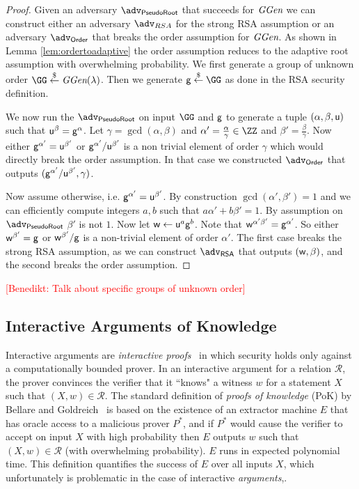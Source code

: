 \documentclass{article}
\theoremstyle{definition}
\newcommand{\benedikt}[1]{{\textcolor{red}{[Benedikt: #1]}}}
\newcommand{\benedikt}[1]{}
\begin{document}
\begin{proof}
	Given an adversary $\adv_{\textsf{PseudoRoot}}$ that succeeds for $\textit{GGen}$ we can construct either an adversary $\adv_{RSA}$ for the strong RSA assumption or an adversary $\adv_{\textsf{Order}}$ that breaks the order assumption for $\textit{GGen}$. As shown in Lemma \ref{lem:ordertoadaptive} the order assumption reduces to the adaptive root assumption with overwhelming probability. 
	We first generate a group of unknown order $\GG \sample \ggen(\lambda)$.
	Then we generate $\gr{g}\sample \GG$ as done in the \textsf{RSA} security definition.
	
	We now run the $\adv_{\textsf{PseudoRoot}}$ on input $\GG$ and $\mathsf{g}$ to generate a tuple $(\alpha,\beta,\mathsf{u})$ such that $\mathsf{u}^{\beta}=\mathsf{g}^{\alpha}$. Let $\gamma=\gcd(\alpha,\beta)$ and $\alpha'=\frac{\alpha}{\gamma}\in \ZZ$ and  $\beta'=\frac{\beta}{\gamma}$. Now either $\mathsf{g}^{\alpha'}=\mathsf{u}^{\beta'}$ or $\mathsf{g}^{\alpha'}/\mathsf{u}^{\beta'}$ is a non trivial element of order $\gamma$ which would directly break the order assumption. In that case we constructed $\adv_{\textsf{Order}}$ that outputs $(\mathsf{g}^{\alpha'}/\mathsf{u}^{\beta'},\gamma)$.
	
	Now assume otherwise, i.e. $\mathsf{g}^{\alpha'}=\mathsf{u}^{\beta'}$. By construction $\gcd(\alpha',\beta')=1$ and we can efficiently compute integers $a,b$ such that $a \alpha'+b \beta'=1$. By assumption on $\adv_{\textsf{PseudoRoot}}$ $\beta'$ is not $1$. Now let $\mathsf{w}\gets \mathsf{u}^{a}\mathsf{g}^{b}$. Note that $\mathsf{w}^{\alpha'\beta'}=\mathsf{g}^{\alpha'}$. So either $\mathsf{w}^{\beta'}=\mathsf{g}$ or $\mathsf{w}^{\beta'}/\mathsf{g}$ is a non-trivial element of order $\alpha'$. The first case breaks the strong RSA assumption, as we can construct $\adv_{\textsf{RSA}}$ that outputs $(\mathsf{w},\beta)$, and the second breaks the order assumption.
\end{proof}


\benedikt{Talk about specific groups of unknown order}

\subsection{Interactive Arguments of Knowledge}
Interactive arguments are \emph{interactive proofs}~\cite{GolMicRac89} in which security holds only against a computationally bounded prover. In an interactive argument for a relation $\mathcal{R}$, the prover convinces the verifier that it ``knows" a witness $w$ for a statement $X$ such that $(X, w) \in \mathcal{R}$. The standard definition of \emph{proofs of knowledge} (PoK) by Bellare and Goldreich~\cite{C:BelGol92} is based on the existence of an extractor machine $E$ that has oracle access to a malicious prover $P^*$, and if $P^*$ would cause the verifier to accept on input $X$ with high probability then $E$ outputs $w$ such that $(X, w) \in \mathcal{R}$ (with overwhelming probability). $E$ runs in expected polynomial time. This definition quantifies the success of $E$ over all inputs $X$, which unfortunately is problematic in the case of interactive  \emph{arguments},.
\end{document}
